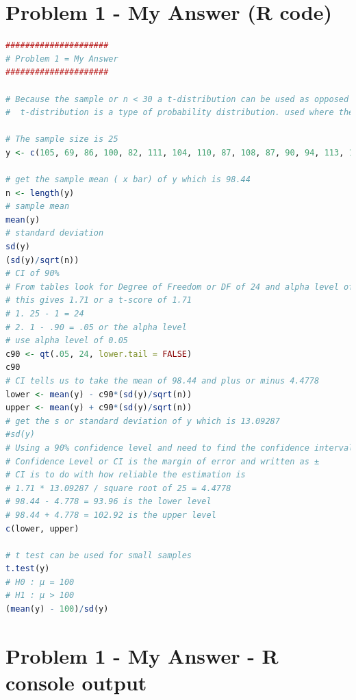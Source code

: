 \documentclass[12pt,letterpaper]{article}
\begin{document}
\section*{Problem 1 - My Answer (R code)}
	


\begin{lstlisting}[language=R]
#####################
# Problem 1 = My Answer
#####################

# Because the sample or n < 30 a t-distribution can be used as opposed to a normal distribution
#  t-distribution is a type of probability distribution. used where the sample size is small.

# The sample size is 25
y <- c(105, 69, 86, 100, 82, 111, 104, 110, 87, 108, 87, 90, 94, 113, 112, 98, 80, 97, 95, 111, 114, 89, 95, 126, 98)

# get the sample mean ( x bar) of y which is 98.44
n <- length(y) 
# sample mean
mean(y)
# standard deviation
sd(y)
(sd(y)/sqrt(n))
# CI of 90%
# From tables look for Degree of Freedom or DF of 24 and alpha level of 0.05
# this gives 1.71 or a t-score of 1.71
# 1. 25 - 1 = 24
# 2. 1 - .90 = .05 or the alpha level
# use alpha level of 0.05
c90 <- qt(.05, 24, lower.tail = FALSE)
c90
# CI tells us to take the mean of 98.44 and plus or minus 4.4778
lower <- mean(y) - c90*(sd(y)/sqrt(n))
upper <- mean(y) + c90*(sd(y)/sqrt(n))
# get the s or standard deviation of y which is 13.09287
#sd(y)
# Using a 90% confidence level and need to find the confidence interval
# Confidence Level or CI is the margin of error and written as ±
# CI is to do with how reliable the estimation is
# 1.71 * 13.09287 / square root of 25 = 4.4778
# 98.44 - 4.778 = 93.96 is the lower level
# 98.44 + 4.778 = 102.92 is the upper level
c(lower, upper)

# t test can be used for small samples
t.test(y)
# H0 : μ = 100
# H1 : μ > 100
(mean(y) - 100)/sd(y)

\end{lstlisting}
	
\newpage

\section*{Problem 1 - My Answer  - R console output}
	
\end{document}

